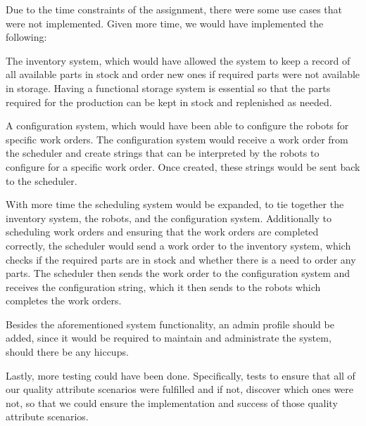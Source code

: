 
Due to the time constraints of the assignment, there were some use cases that were not implemented. Given more time, we would have implemented the following:

The inventory system, which would have allowed the system to keep a record of all available parts in stock and order new ones if required parts were not available in storage. Having a functional storage system is essential so that the parts required for the production can be kept in stock and replenished as needed.

A configuration system, which would have been able to configure the robots for specific work orders. The configuration system would receive a work order from the scheduler and create strings that can be interpreted by the robots to configure for a specific work order. Once created, these strings would be sent back to the scheduler.

With more time the scheduling system would be expanded, to tie together the inventory system, the robots, and the configuration system. Additionally to scheduling work orders and ensuring that the work orders are completed correctly, the scheduler would send a work order to the inventory system, which checks if the required parts are in stock and whether there is a need to order any parts. The scheduler then sends the work order to the configuration system and receives the configuration string, which it then sends to the robots which completes the work orders.

Besides the aforementioned system functionality, an admin profile should be added, since it would be required to maintain and administrate the system, should there be any hiccups. 

Lastly, more testing could have been done. Specifically, tests to ensure that all of our quality attribute scenarios were fulfilled and if not, discover which ones were not, so that we could ensure the implementation and success of those quality attribute scenarios.